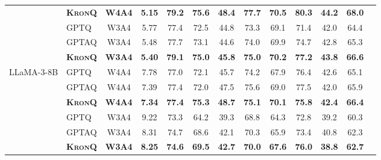 \documentclass{article} %
\newcommand{\KronQ}{\textsc{KronQ}}
\begin{document}
\begin{table}[H]
{\begin{NiceTabular}{l||l|c|c|ccccccccr}
 & \textbf{\KronQ} & \textbf{W4A4} & \textbf{5.15} & \textbf{79.2} & \textbf{75.6} & \textbf{48.4} & \textbf{77.7} & \textbf{70.5} & \textbf{80.3} & \textbf{44.2} & \textbf{68.0} \\
 & GPTQ  & W3A4 &  5.77 & 77.4 & 72.5 & 44.8 & 73.3 & 69.1 & 71.4 & 42.0 & 64.4 \\
 & GPTAQ & W3A4 &  5.48 & 77.7 & 73.1 & 44.6 & 74.0 & 69.9 & 74.7 & 42.8 & 65.3 \\
 & \textbf{\KronQ} & \textbf{W3A4} & \textbf{5.40} & \textbf{79.1} & \textbf{75.0} & \textbf{45.8} & \textbf{75.0} & \textbf{70.2} & \textbf{77.2} & \textbf{43.8} & \textbf{66.6} \\
\midrule
LLaMA-3-8B
 & GPTQ  & W4A4 &  7.78 & 77.0 & 72.1 & 45.7 & 74.2 & 67.9 & 76.4 & 42.6 & 65.1 \\
 & GPTAQ & W4A4 &  7.39 & 77.4 & 72.0 & 47.5 & 75.6 & 69.0 & 77.5 & 42.0 & 65.9 \\
 & \textbf{\KronQ} & \textbf{W4A4} & \textbf{7.34} & \textbf{77.4} & \textbf{75.3} & \textbf{48.7} & \textbf{75.1} & \textbf{70.1} & \textbf{75.8} & \textbf{42.4} & \textbf{66.4} \\
 & GPTQ  & W3A4 &  9.22 & 73.3 & 64.2 & 39.3 & 68.8 & 64.3 & 72.8 & 39.2 & 60.3 \\
 & GPTAQ & W3A4 &  8.31 & 74.7 & 68.6 & 42.1 & 70.3 & 65.9 & 73.4 & 40.8 & 62.3 \\
 & \textbf{\KronQ} & \textbf{W3A4} & \textbf{8.25} & \textbf{74.6} & \textbf{69.5} & \textbf{42.7} & \textbf{70.0} & \textbf{67.6} & \textbf{76.0} & \textbf{38.8} & \textbf{62.7} \\
\bottomrule
\end{NiceTabular}}
\end{table}
\end{document}
